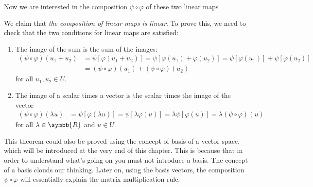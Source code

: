 Now we are interested in the composition $\psi\circ\varphi$ of these two linear maps
\begin{center}
\end{center}

We claim that \emph{the composition of linear maps is linear}.
To prove this, we need to check that the two conditions for linear maps are satisfied:
\begin{enumerate}
\item The image of the sum is the sum of the images:
  \begin{align*}
    (\psi\circ\varphi) (u_1 + u_2) &= \psi[\varphi(u_1 + u_2)]
                                     = \psi[\varphi(u_1) + \varphi(u_2)]
                                     = \psi[\varphi(u_1)] + \psi[\varphi(u_2)]\\
                                   &= (\psi\circ\varphi) (u_1) + (\psi\circ\varphi) (u_2)
  \end{align*}
  for all $u_1, u_2\in U$.
\item The image of a scalar times a vector is the scalar times the image of the vector
  \begin{align*}
    (\psi\circ\varphi) (\lambda u) &= \psi[\varphi(\lambda u)]
                                     = \psi[\lambda \varphi(u)]
                                     = \lambda \psi[\varphi(u)]
                                   = \lambda (\psi\circ\varphi) (u)
  \end{align*}
  for all $\lambda\in\symbb{R}$ and $u\in U$.
\end{enumerate}

This theorem could also be proved using the concept of basis of a vector space, which will be
introduced at the very end of this chapter. This is because that in order to understand what's
going on you must not introduce a basis. The concept of a basis clouds our thinking. Later on,
using the basis vectors, the composition $\psi\circ\varphi$ will essentially explain the matrix
multiplication rule.

